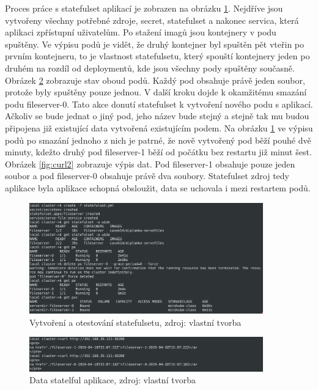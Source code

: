 \par      Proces práce s statefulset aplikací je zobrazen na obrázku \ref{fig:statefulset}. Nejdříve jsou \linebreak vytvořeny všechny potřebné zdroje, secret, statefulset a nakonec servica, která aplikaci zpřístupní uživatelům. Po stažení imagů jsou kontejnery v podu spuštěny. Ve výpisu podů je vidět, že druhý kontejner byl spuštěn pět vteřin po prvním kontejneru, to je vlastnost statefulsetu, který spouští kontejnery jeden po druhém na rozdíl od deploymentů, kde jsou všechny pody spuštěny současně. Obrázek \ref{fig:curl1} zobrazuje stav oboud podů. Každý pod obsahuje právě jeden soubor, protože byly spuštěny pouze jednou. V další kroku dojde k okamžitému smazání podu fileserver-0. Tato akce donutí statefulset k vytvoření nového podu s aplikací. Ačkoliv se bude jednat o jiný pod, jeho název bude stejný a stejně tak mu budou připojena již existující data vytvořená existujícím podem. Na obrázku \ref{fig:statefulset} ve výpisu podů po smazání jednoho z nich je patrné, že nově vytvořený pod běží pouhé dvě minuty, kdežto druhý pod fileserver-1 běží od počátku bez restartu již minut šest. Obrázek \ref{fig:curl2} zobrazuje výpis dat. Pod fileserver-1 obsahuje pouze jeden soubor a pod fileserver-0 obsahuje právě dva soubory. Statefulset zdroj tedy aplikace byla aplikace schopná obsloužit, data se uchovala i mezi restartem podů.

\begin{figure}[H]
  \begin{centering}
	  \includegraphics[width=0.9\textwidth]{images/statefulset.png}
    \par
	  \caption{Vytvoření a otestování statefulsetu\label{fig:statefulset}, zdroj: vlastní tvorba}
    \end{centering}
\end{figure}


\begin{figure}[H]
  \begin{centering}
	  \includegraphics[width=0.9\textwidth]{images/curl1.png}
    \par
	  \caption{Data statelful aplikace\label{fig:curl1}, zdroj: vlastní tvorba}
    \end{centering}
\end{figure}

